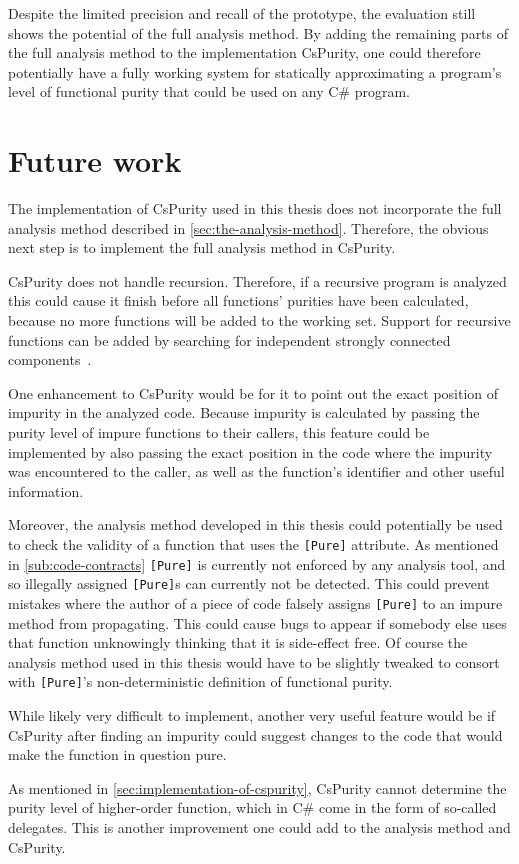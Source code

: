 \documentclass[a4paper,12pt]{article}
\begin{document}
Despite the limited precision and recall of the prototype, the evaluation still shows the potential of the full analysis method. By adding the remaining parts of the full analysis method to the implementation CsPurity, one could therefore potentially have a fully working system for statically approximating a program's level of functional purity that could be used on any C\# program.

\section{Future work} \label{sec:future-work}

The implementation of CsPurity used in this thesis does not incorporate the full analysis method described in \autoref{sec:the-analysis-method}. Therefore, the obvious next step is to implement the full analysis method in CsPurity.

CsPurity does not handle recursion. Therefore, if a recursive program is analyzed this could cause it finish before all functions' purities have been calculated, because no more functions will be added to the working set. Support for recursive functions can be added by searching for independent strongly connected components~\cite{pitidis2010purity}.

One enhancement to CsPurity would be for it to point out the exact position of impurity in the analyzed code. Because impurity is calculated by passing the purity level of impure functions to their callers, this feature could be implemented by also passing the exact position in the code where the impurity was encountered to the caller, as well as the function's identifier and other useful information.

Moreover, the analysis method developed in this thesis could potentially be used to check the validity of a function that uses the \texttt{[Pure]} attribute. As mentioned in \autoref{sub:code-contracts} \texttt{[Pure]} is currently not enforced by any analysis tool, and so illegally assigned \texttt{[Pure]}s can currently not be detected. This could prevent mistakes where the author of a piece of code falsely assigns \texttt{[Pure]} to an impure method from propagating. This could cause bugs to appear if somebody else uses that function unknowingly thinking that it is side-effect free. Of course the analysis method used in this thesis would have to be slightly tweaked to consort with \texttt{[Pure]}'s non-deterministic definition of functional purity.

While likely very difficult to implement, another very useful feature would be if CsPurity after finding an impurity could suggest changes to the code that would make the function in question pure.

As mentioned in \autoref{sec:implementation-of-cspurity}, CsPurity cannot determine the purity level of higher-order function, which in C\# come in the form of so-called delegates. This is another improvement one could add to the analysis method and CsPurity.

\newpage



\end{document}
